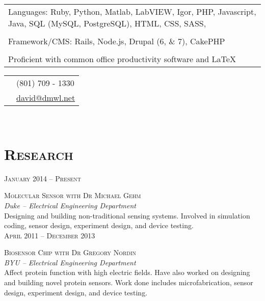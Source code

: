 \documentclass[10pt]{article}
\begin{document}
{\begin{minipage}[t]{0.5\textwidth}
	\begin{tabular}{p{8cm}}
      Languages: Ruby, Python, Matlab, LabVIEW, Igor, PHP, Javascript, Java, SQL (MySQL, PostgreSQL), HTML, CSS, SASS, \\\\
    Framework/CMS: Rails, Node.js, Drupal (6, \& 7), CakePHP\\\\
    Proficient with common office productivity software and \LaTeX{}\\
	\end{tabular}
	
\end{minipage} %
\hfill
\begin{minipage}[t]{0.44\textwidth} %
	
	\vspace{0pt} %
	
\colorbox{shade}{\textcolor{text1}{
	\begin{tabular}{c|p{7cm}}
		\raisebox{-3pt}{\Phone}  		&(801) 709 - 1330\\
		\raisebox{-3pt}{\Envelope} 	&\href{mailto:david@dmwl.net}
								{david@dmwl.net}
	\end{tabular}
	}
}\\[10pt]

\section{\textsc{Research}}

	\raggedleft
	\textsc{\normalsize January 2014 -- Present}\par

	\raggedright\large \textsc{Molecular Sensor with Dr Michael Gehm }\\
  \emph{Duke -- Electrical Engineering Department}\\[5pt]
  \normalsize{%
    Designing and building non-traditional sensing systems.
    Involved in simulation coding, sensor design, experiment design, and device testing.
  }\\[10pt]

	\raggedleft
	\textsc{\normalsize April 2011 -- December 2013}\par

	\raggedright\large \textsc{Biosensor Chip with Dr Gregory Nordin}\\
  \emph{BYU -- Electrical Engineering Department}\\[5pt]
  \normalsize{%
    Affect protein function with high electric fields.
    Have also worked on designing and building novel protein sensors.
    Work done includes microfabrication, sensor design, experiment design, and device testing.
  }\\[10pt]


\end{minipage}}
\end{document}
